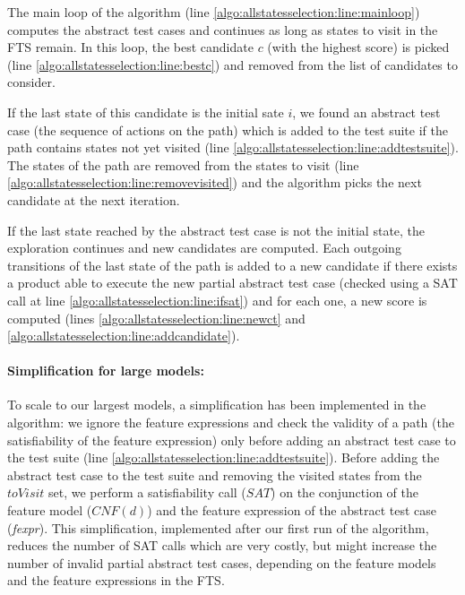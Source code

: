 The main loop of the algorithm (line \ref{algo:allstatesselection:line:mainloop}) computes the abstract test cases and continues as long as states to visit in the FTS remain. In this loop, the best candidate $c$ (with the highest score) is picked (line \ref{algo:allstatesselection:line:bestc}) and removed from the list of candidates to consider. 

If the last state of this candidate is the initial sate $i$, we found an abstract test case (\ie the sequence of actions on the path) which is added to the test suite if the path contains states not yet visited (line \ref{algo:allstatesselection:line:addtestsuite}). 
The states of the path are removed from the states to visit (line \ref{algo:allstatesselection:line:removevisited}) and the algorithm picks the next candidate at the next iteration. 

If the last state reached by the abstract test case is not the initial state, the exploration continues and new candidates are computed. Each outgoing transitions of the last state of the path is added to a new candidate if there exists a product able to execute the new partial abstract test case (checked using a SAT call at line \ref{algo:allstatesselection:line:ifsat}) and for each one, a new score is computed (lines \ref{algo:allstatesselection:line:newct} and \ref{algo:allstatesselection:line:addcandidate}).

\paragraph{Simplification for large models:}

To scale to our largest models, a simplification has been implemented in the algorithm: we ignore the feature expressions and check the validity of a path (\ie the satisfiability of the feature expression) only before adding an abstract test case to the test suite (line \ref{algo:allstatesselection:line:addtestsuite}). Before adding the abstract test case to the test suite and removing the visited states from the $toVisit$ set, we perform a satisfiability call ($SAT$) on the conjunction of the feature model ($\mathit{CNF}(d)$) and the feature expression of the abstract test case (\textit{fexpr}). This simplification, implemented after our first run of the algorithm, reduces the number of SAT calls which are very costly, but might increase the number of invalid partial abstract test cases, depending on the feature models and the feature expressions in the FTS.

